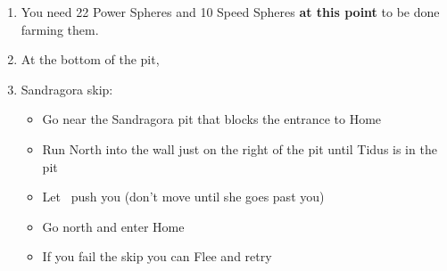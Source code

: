\begin{enumerate}[resume]
	\blitzballdetermination[true]{
		\item \formation{\tidus}{\lulu}{\auron}
	}{
		\item \formation{\tidus}{\rikku}{\kimahri}
	}
	\item You need 22 Power Spheres and 10 Speed Spheres \textbf{at this point} to be done farming them.
	\item At the bottom of the pit, 
	\item Sandragora skip:
		\begin{itemize}
			\item Go near the Sandragora pit that blocks the entrance to Home
			\item Run North into the wall just on the right of the pit until Tidus is in the pit
			\item Let \rikku\ push you (don't move until she goes past you)
			\item Go north and enter Home
			\item If you fail the skip you can Flee and retry
		\end{itemize}
\end{enumerate}
\ \lossvfill \ \lossnewline \losscb \ 
